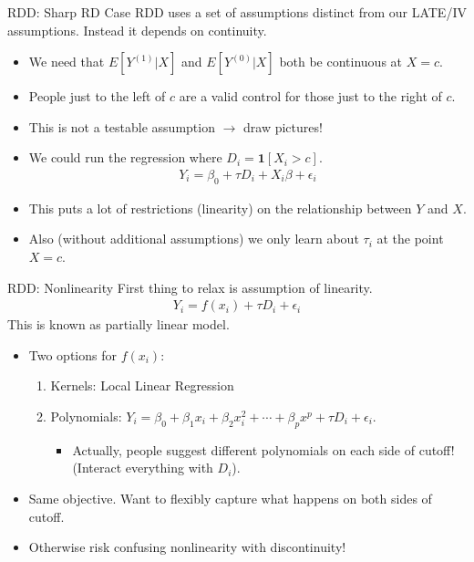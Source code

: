 \documentclass[xcolor=pdftex,dvipsnames,table,mathserif]{beamer}
\begin{document}
\begin{frame}{RDD: Sharp RD Case}
RDD uses a set of assumptions distinct from our LATE/IV assumptions. Instead it depends on \alert{continuity}.
\begin{itemize}
\item We need that $E[Y^{(1)} | X]$ and $E[Y^{(0)} | X]$ both be continuous at $X=c$.
\item People just to the left of $c$ are a valid control for those just to the right of $c$.
\item \alert{This is not a testable assumption} $\rightarrow$ draw pictures!
\item We could run the regression where $D_i = \mathbf{1}[X_i > c]$.
\begin{eqnarray*}
Y_i = \beta_0 + \tau D_i + X_i \beta + \epsilon_i
\end{eqnarray*}
\item This puts a lot of restrictions (linearity) on the relationship between $Y$ and $X$.
\item Also (without additional assumptions) we only learn about $\tau_i$ at the point $X=c$.
\end{itemize}
\end{frame}


\begin{frame}{RDD: Nonlinearity}
First thing to relax is assumption of linearity.
\begin{eqnarray*}
Y_i = f(x_i) + \tau D_i  + \epsilon_i
\end{eqnarray*}
This is known as \alert{partially linear model}.
\begin{itemize}
\item Two options for $f(x_i)$:
\begin{enumerate}
\item Kernels: Local Linear Regression
\item Polynomials: $Y_i = \beta_0 + \beta_1 x_i + \beta_2 x_i^2 + \cdots + \beta_p x^p + \tau D_i + \epsilon_i$.
\begin{itemize}
\item Actually, people suggest different polynomials on each side of cutoff! (Interact everything with $D_i$).
\end{itemize}
\end{enumerate}
\item Same objective. Want to flexibly capture what happens on both sides of cutoff.
\item Otherwise risk confusing nonlinearity with discontinuity!
\end{itemize}
\end{frame}
	
\end{document}
